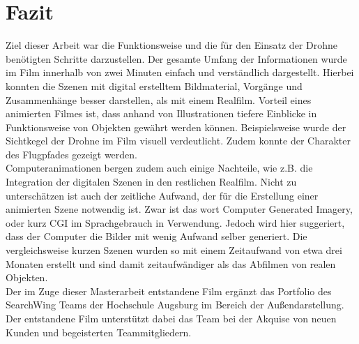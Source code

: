 \chapter{Fazit}

Ziel dieser Arbeit war die Funktionsweise und die für den Einsatz der Drohne benötigten Schritte darzustellen. Der gesamte Umfang der Informationen wurde im Film innerhalb von zwei Minuten einfach und verständlich dargestellt. Hierbei konnten die Szenen mit digital erstelltem Bildmaterial, Vorgänge und Zusammenhänge besser darstellen, als mit einem Realfilm. Vorteil eines animierten Filmes ist, dass anhand von Illustrationen tiefere Einblicke in Funktionsweise von Objekten gewährt werden können. Beispielsweise wurde der Sichtkegel der Drohne im Film visuell verdeutlicht. Zudem konnte der Charakter des Flugpfades gezeigt werden.\\
Computeranimationen bergen zudem auch einige Nachteile, wie z.B. die Integration der digitalen Szenen in den restlichen Realfilm. Nicht zu unterschätzen ist auch der zeitliche Aufwand, der für die Erstellung einer animierten Szene notwendig ist. Zwar ist das wort Computer Generated Imagery, oder kurz CGI im Sprachgebrauch in Verwendung. Jedoch wird hier suggeriert, dass der Computer die Bilder mit wenig Aufwand selber generiert. Die vergleichsweise kurzen Szenen wurden so mit einem Zeitaufwand von etwa drei Monaten erstellt und sind damit zeitaufwändiger als das Abfilmen von realen Objekten.\\

Der im Zuge dieser Masterarbeit entstandene Film ergänzt das Portfolio des SearchWing Teams der Hochschule Augsburg im Bereich der Außendarstellung.
Der entstandene Film unterstützt dabei das Team bei der Akquise von neuen Kunden und begeisterten Teammitgliedern.
